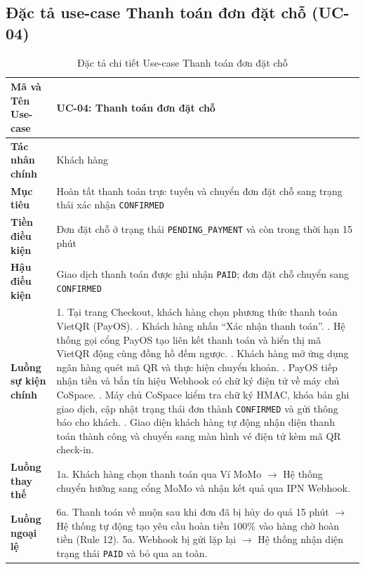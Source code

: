 \subsection{Đặc tả use-case Thanh toán đơn đặt chỗ (UC-04)}
\begin{table}[H]
\centering
\small
\renewcommand{\arraystretch}{1.2}
\begin{tabular}{|p{3.6cm}|p{10.4cm}|}
\hline
\textbf{Mã và Tên Use-case} & \textbf{UC-04: Thanh toán đơn đặt chỗ} \\ \hline
\textbf{Tác nhân chính} & Khách hàng \\ \hline
\textbf{Mục tiêu} & Hoàn tất thanh toán trực tuyến và chuyển đơn đặt chỗ sang trạng thái xác nhận \texttt{CONFIRMED} \\ \hline
\textbf{Tiền điều kiện} & Đơn đặt chỗ ở trạng thái \texttt{PENDING\_PAYMENT} và còn trong thời hạn 15 phút \\ \hline
\textbf{Hậu điều kiện} & Giao dịch thanh toán được ghi nhận \texttt{PAID}; đơn đặt chỗ chuyển sang \texttt{CONFIRMED} \\ \hline
\textbf{Luồng sự kiện chính} & 
1. Tại trang Checkout, khách hàng chọn phương thức thanh toán VietQR (PayOS). \newline
2. Khách hàng nhấn ``Xác nhận thanh toán''. \newline
3. Hệ thống gọi cổng PayOS tạo liên kết thanh toán và hiển thị mã VietQR động cùng đồng hồ đếm ngược. \newline
4. Khách hàng mở ứng dụng ngân hàng quét mã QR và thực hiện chuyển khoản. \newline
5. PayOS tiếp nhận tiền và bắn tín hiệu Webhook có chữ ký điện tử về máy chủ CoSpace. \newline
6. Máy chủ CoSpace kiểm tra chữ ký HMAC, khóa bản ghi giao dịch, cập nhật trạng thái đơn thành \texttt{CONFIRMED} và gửi thông báo cho khách. \newline
7. Giao diện khách hàng tự động nhận diện thanh toán thành công và chuyển sang màn hình vé điện tử kèm mã QR check-in. \\ \hline
\textbf{Luồng thay thế} & 
1a. Khách hàng chọn thanh toán qua Ví MoMo $\rightarrow$ Hệ thống chuyển hướng sang cổng MoMo và nhận kết quả qua IPN Webhook. \\ \hline
\textbf{Luồng ngoại lệ} & 
6a. Thanh toán về muộn sau khi đơn đã bị hủy do quá 15 phút $\rightarrow$ Hệ thống tự động tạo yêu cầu hoàn tiền $100\%$ vào hàng chờ hoàn tiền (Rule 12). \newline
5a. Webhook bị gửi lặp lại $\rightarrow$ Hệ thống nhận diện trạng thái \texttt{PAID} và bỏ qua an toàn. \\ \hline
\end{tabular}
\caption{Đặc tả chi tiết Use-case Thanh toán đơn đặt chỗ}
\label{tab:uc_spec_04}
\end{table}

